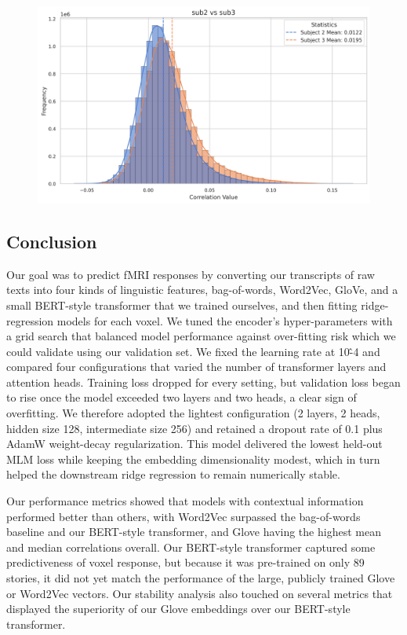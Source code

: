 \documentclass{article}
\begin{document}
\begin{figure}[H]
\centering
\captionsetup{width=\textwidth}
\includegraphics[width=1\textwidth]{./figs/comparing_both_subjects_glove.png}
\label{subjects}
\end{figure}

\subsection{Conclusion}

Our goal was to predict fMRI responses by converting our transcripts of raw texts into four kinds of linguistic features, bag-of-words, Word2Vec, GloVe, and a small BERT-style transformer that we trained ourselves, and then fitting ridge-regression models for each voxel. We tuned the encoder’s hyper-parameters with a grid search that balanced model performance against over-fitting risk which we could validate using our validation set. We fixed the learning rate at 10\^-4 and compared four configurations that varied the number of transformer layers and attention heads. Training loss dropped for every setting, but validation loss began to rise once the model exceeded two layers and two heads, a clear sign of overfitting. We therefore adopted the lightest configuration (2 layers, 2 heads, hidden size 128, intermediate size 256) and retained a dropout rate of 0.1 plus AdamW weight-decay regularization. This model delivered the lowest held-out MLM loss while keeping the embedding dimensionality modest, which in turn helped the downstream ridge regression to remain numerically stable.

Our performance metrics showed that models with contextual information performed better than others, with Word2Vec surpassed the bag-of-words baseline and our BERT-style transformer, and Glove having the highest mean and median correlations overall. Our BERT-style transformer captured some predictiveness of voxel response, but because it was pre-trained on only 89 stories, it did not yet match the performance of the large, publicly trained Glove or Word2Vec vectors. Our stability analysis also touched on several metrics that displayed the superiority of our Glove embeddings over our BERT-style transformer.
\end{document}
